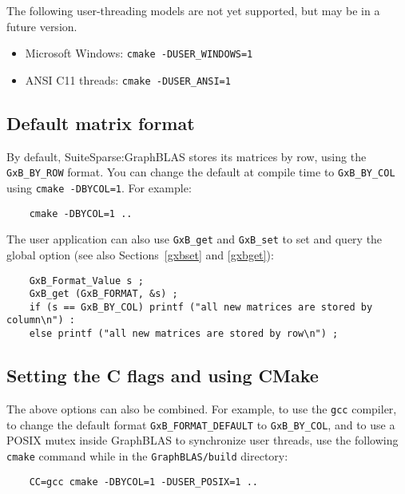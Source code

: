 \documentclass[12pt]{article}
\begin{document}
The following user-threading models are not yet supported, but may be in
a future version.

\begin{itemize}
\item Microsoft Windows:  \verb'cmake -DUSER_WINDOWS=1'
\item ANSI C11 threads:   \verb'cmake -DUSER_ANSI=1'
\end{itemize}

\subsection{Default matrix format}

By default, SuiteSparse:GraphBLAS stores its matrices by row, using the
\verb'GxB_BY_ROW' format.  You can change the default at compile time to
\verb'GxB_BY_COL' using \verb'cmake -DBYCOL=1'.  For example:

    {\small
    \begin{verbatim}
    cmake -DBYCOL=1 ..  \end{verbatim} }

The user application can also use \verb'GxB_get' and \verb'GxB_set' to set and
query the global option (see also Sections~\ref{gxbset} and \ref{gxbget}):

    {\small
    \begin{verbatim}
    GxB_Format_Value s ;
    GxB_get (GxB_FORMAT, &s) ;
    if (s == GxB_BY_COL) printf ("all new matrices are stored by column\n") :
    else printf ("all new matrices are stored by row\n") ; \end{verbatim} }

\subsection{Setting the C flags and using CMake}

The above options can also be combined.  For example, to use the \verb'gcc'
compiler, to change the default format \verb'GxB_FORMAT_DEFAULT' to
\verb'GxB_BY_COL', and to use a POSIX mutex inside GraphBLAS to synchronize
user threads, use the following \verb'cmake' command while in the
\verb'GraphBLAS/build' directory:

    {\small
    \begin{verbatim}
    CC=gcc cmake -DBYCOL=1 -DUSER_POSIX=1 .. \end{verbatim}}
\end{document}
